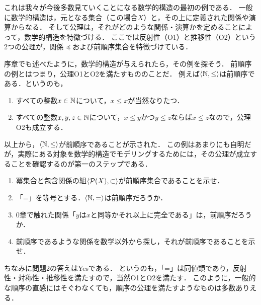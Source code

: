 \documentclass[11pt,a4paper]{jsarticle}
\begin{document}
これは我々が今後多数見ていくことになる数学的構造の最初の例である．
一般に数学的構造は，元となる集合（この場合$X$）と，その上に定義された関係や演算からなる．
そして公理は，それがどのような関係・演算かを定めることによって，数学的構造を特徴づける．
ここでは反射性（O1）と推移性（O2）という2つの公理が，関係$\preceq$および前順序集合を特徴づけている．

序章でも述べたように，数学的構造が与えられたら，その例を探そう．
前順序の例とはつまり，公理O1とO2を満たすもののことだ．
例えば$\langle \mathbb{N}, \leq \rangle$は前順序である．というのも，
\begin{enumerate}
 \item すべての整数$x \in \mathbb{N}$について，$x \leq x$が当然なりたつ．
 \item すべての整数$x, y, z \in \mathbb{N}$について，$x \leq y$かつ$y \leq z$ならば$x \leq z$なので，公理O2も成立する．
\end{enumerate}
以上から，$\langle \mathbb{N}, \leq \rangle$が前順序であることが示された．
この例はあまりにも自明だが，実際にある対象を数学的構造でモデリングするためには，その公理が成立することを確認するのが第一のステップである．

\begin{exercise}
\begin{enumerate}
 \item 冪集合と包含関係の組$\langle \mathcal{P}(X), \subset \rangle$が前順序集合であることを示せ． 
 \item 「=」を等号とする．$\langle \mathbb{N}, = \rangle$は前順序だろうか．
 \item 0章で触れた関係「$y$は$x$と同等かそれ以上に完全である」は，前順序だろうか．
 \item 前順序であるような関係を数学以外から探し，それが前順序であることを示せ．
\end{enumerate}
\end{exercise}

ちなみに問題2の答えはYesである．
というのも，「=」は同値類であり，反射性・対称性・推移性を満たすので，当然O1とO2を満たす．
このように，一般的な順序の直感にはそぐわなくても，順序の公理を満たすようなものは多数ありえる．
\end{document}
